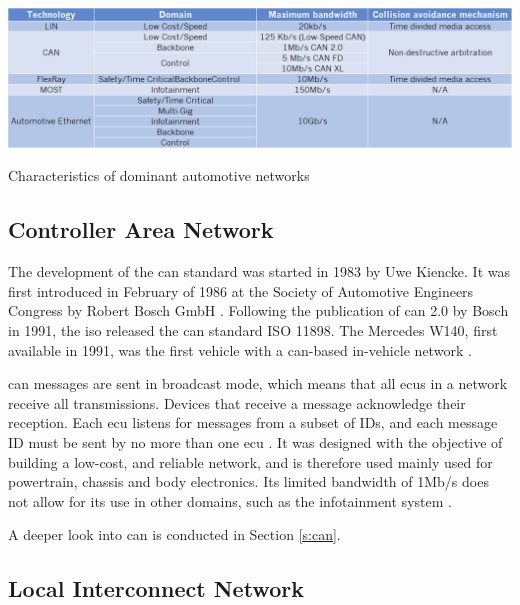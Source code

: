 \begin{table}
    \centering
    \includegraphics[width = \textwidth]{img/parts/introduction/Network Table.png}
    \caption{Characteristics of dominant automotive networks}
    \label{fig:auto_networks}
\end{table}

\subsection{Controller Area Network}
\label{subsec:can}

The development of the \gls{can} standard was started in 1983 by Uwe Kiencke. It was first introduced in February of 1986 at the Society of Automotive Engineers Congress by Robert Bosch GmbH \citep{can}. Following the publication of \gls{can} 2.0 by Bosch in 1991, the \gls{iso} released the \gls{can} standard ISO 11898. The Mercedes W140, first available in 1991, was the first vehicle with a \gls{can}-based in-vehicle network \citep{CAN_Merc}.\par
\gls{can} messages are sent in broadcast mode, which means that all \glspl{ecu} in a network receive all transmissions. Devices that receive a message acknowledge their reception. Each \gls{ecu} listens for messages from a subset of IDs, and each message ID must be sent by no more than one \gls{ecu} \citep{kulandaivel2019canvas}. It was designed with the objective of building a low-cost, and reliable network, and is therefore used mainly used for powertrain, chassis and body electronics. Its limited bandwidth of 1Mb/s does not allow for its use in other domains, such as the infotainment system \citep{Huang2019}.\par
A deeper look into \gls{can} is conducted in Section \ref{s:can}.

\subsection{Local Interconnect Network}

